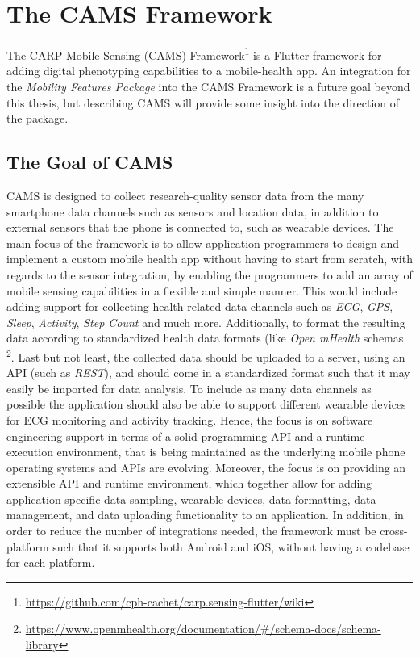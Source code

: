 \section{The CAMS Framework}
The CARP Mobile Sensing (CAMS) Framework\footnote{\url{https://github.com/cph-cachet/carp.sensing-flutter/wiki}} is a Flutter framework for adding digital phenotyping capabilities to a mobile-health app. An integration for the \textit{Mobility Features Package} into the CAMS Framework is a future goal beyond this thesis, but describing CAMS will provide some insight into the direction of the package. 

\subsection{The Goal of CAMS}
CAMS is designed to collect research-quality sensor data from the many smartphone data channels such as sensors and location data, in addition to external sensors that the phone is connected to, such as wearable devices. The main focus of the framework is to allow application programmers to design and implement a custom mobile health app without having to start from scratch, with regards to the sensor integration, by enabling the programmers to add an array of mobile sensing capabilities in a flexible and simple manner. This would include adding support for collecting health-related data channels such as \textit{ECG}, \textit{GPS}, \textit{Sleep}, \textit{Activity}, \textit{Step Count} and much more. Additionally, to format the resulting data according to standardized health data formats (like \textit{Open mHealth} schemas \footnote{\url{https://www.openmhealth.org/documentation/#/schema-docs/schema-library}}. Last but not least, the collected data should be uploaded to a server, using an API (such as \textit{REST}), and should come in a standardized format such that it may easily be imported for data analysis. To include as many data channels as possible the application should also be able to support different wearable devices for ECG monitoring and activity tracking. Hence, the focus is on software engineering support in terms of a solid programming API and a runtime execution environment, that is being maintained as the underlying mobile phone operating systems and APIs are evolving. Moreover, the focus is on providing an extensible API and runtime environment, which together allow for adding application-specific data sampling, wearable devices, data formatting, data management, and data uploading functionality to an application. In addition, in order to reduce the number of integrations needed, the framework must be cross-platform such that it supports both Android and iOS, without having a codebase for each platform.

